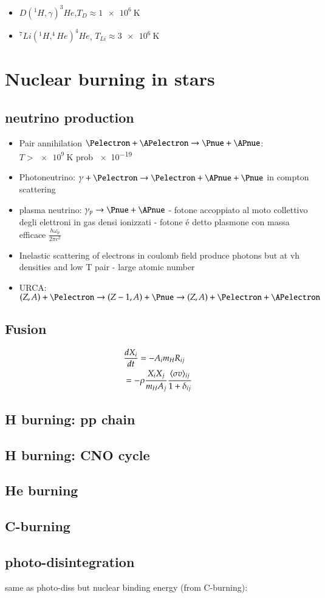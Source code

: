 \documentclass[main.tex]{subfiles}
\begin{document}
\begin{itemize}
\item $D(^1H,\gamma)^3He$,$T_D\approx \SI{1e6}{\kelvin}$
\item $^7Li(^1H,^4He)^4He$, $T_{Li}\approx\SI{3e6}{\kelvin}$ 

\end{itemize}

\chapter{Nuclear burning in stars}
\PartialToc

\section{neutrino production}
\begin{itemize}
\item  Pair annihilation $\Pelectron+\APelectron\to\Pnue+\APnue$: $T>\SI{e9}{\kelvin}$ prob \num{e-19}
\item Photoneutrino: $\gamma+\Pelectron\to\Pelectron+\APnue+\Pnue$ in compton scattering
\item plasma neutrino: $\gamma_p\to\Pnue+\APnue$ - fotone accoppiato al moto collettivo degli elettroni in gas densi ionizzati - fotone \'e detto plasmone con massa efficace $\frac{h\omega_p}{2\pi c^2}$
\item Inelastic scattering of electrons in coulomb field produce photons but at vh densities and low T \Pnue\APnue pair - large atomic number
\item URCA: $(Z,A)+\Pelectron\to(Z-1,A)+\Pnue\to(Z,A)+\Pelectron+\APelectron$
\end{itemize}
\section{Fusion}
\begin{align*}
&\TDy{t}{X_i}=-A_im_HR_{ij}\\
&=-\rho\frac{X_iX_j}{m_HA_j}\frac{\exv{\sigma v}_{ij}}{1+\delta_{ij}}
\end{align*} 

\section{H burning: pp chain}

\section{H burning: CNO cycle}

\section{He burning}

\section{C-burning}

\section{photo-disintegration}
same as photo-diss but nuclear binding energy (from C-burning): 
\end{document}
